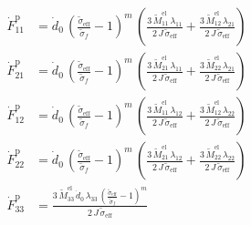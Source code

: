 \begin{align}
\dot{F}^{\mathrm p}_{11} &= \dot{d}_{0}\,{\left(\frac{\tilde{\sigma }_{\mathrm{eff}}}{\tilde{\sigma }_{f}}-1\right)}^m\,\left(\frac{3\,\tilde{M}_{11}^{\mathrm{el}}\,\lambda _{11}}{2\,J\,\tilde{\sigma }_{\mathrm{eff}}}+\frac{3\,\tilde{M}_{12}^{\mathrm{el}}\,\lambda _{21}}{2\,J\,\tilde{\sigma }_{\mathrm{eff}}}\right) \\ 
\dot{F}^{\mathrm p}_{21} &= \dot{d}_{0}\,{\left(\frac{\tilde{\sigma }_{\mathrm{eff}}}{\tilde{\sigma }_{f}}-1\right)}^m\,\left(\frac{3\,\tilde{M}_{21}^{\mathrm{el}}\,\lambda _{11}}{2\,J\,\tilde{\sigma }_{\mathrm{eff}}}+\frac{3\,\tilde{M}_{22}^{\mathrm{el}}\,\lambda _{21}}{2\,J\,\tilde{\sigma }_{\mathrm{eff}}}\right) \\ 
\dot{F}^{\mathrm p}_{12} &= \dot{d}_{0}\,{\left(\frac{\tilde{\sigma }_{\mathrm{eff}}}{\tilde{\sigma }_{f}}-1\right)}^m\,\left(\frac{3\,\tilde{M}_{11}^{\mathrm{el}}\,\lambda _{12}}{2\,J\,\tilde{\sigma }_{\mathrm{eff}}}+\frac{3\,\tilde{M}_{12}^{\mathrm{el}}\,\lambda _{22}}{2\,J\,\tilde{\sigma }_{\mathrm{eff}}}\right) \\ 
\dot{F}^{\mathrm p}_{22} &= \dot{d}_{0}\,{\left(\frac{\tilde{\sigma }_{\mathrm{eff}}}{\tilde{\sigma }_{f}}-1\right)}^m\,\left(\frac{3\,\tilde{M}_{21}^{\mathrm{el}}\,\lambda _{12}}{2\,J\,\tilde{\sigma }_{\mathrm{eff}}}+\frac{3\,\tilde{M}_{22}^{\mathrm{el}}\,\lambda _{22}}{2\,J\,\tilde{\sigma }_{\mathrm{eff}}}\right) \\ 
\dot{F}^{\mathrm p}_{33} &= \frac{3\,\tilde{M}_{33}^{\mathrm{el}}\,\dot{d}_{0}\,\lambda _{33}\,{\left(\frac{\tilde{\sigma }_{\mathrm{eff}}}{\tilde{\sigma }_{f}}-1\right)}^m}{2\,J\,\tilde{\sigma }_{\mathrm{eff}}} 
\end{align}
